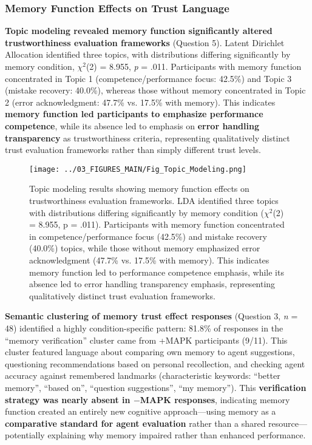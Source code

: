 \documentclass[12pt]{article}
\begin{document}
\subsubsection{Memory Function Effects on Trust Language}

\textbf{Topic modeling revealed memory function significantly altered trustworthiness evaluation frameworks} (Question 5). Latent Dirichlet Allocation identified three topics, with distributions differing significantly by memory condition, $\chi^2$(2) = 8.955, \textit{p} = .011. Participants with memory function concentrated in Topic 1 (competence/performance focus: 42.5\%) and Topic 3 (mistake recovery: 40.0\%), whereas those without memory concentrated in Topic 2 (error acknowledgment: 47.7\% vs. 17.5\% with memory). This indicates \textbf{memory function led participants to emphasize performance competence}, while its absence led to emphasis on \textbf{error handling transparency} as trustworthiness criteria, representing qualitatively distinct trust evaluation frameworks rather than simply different trust levels.

\begin{figure}[h]
\centering
\texttt{[image: ../03\_FIGURES\_MAIN/Fig\_Topic\_Modeling.png]}
\caption{Topic modeling results showing memory function effects on trustworthiness evaluation frameworks. LDA identified three topics with distributions differing significantly by memory condition ($\chi^2$(2) = 8.955, p = .011). Participants with memory function concentrated in competence/performance focus (42.5\%) and mistake recovery (40.0\%) topics, while those without memory emphasized error acknowledgment (47.7\% vs. 17.5\% with memory). This indicates memory function led to performance competence emphasis, while its absence led to error handling transparency emphasis, representing qualitatively distinct trust evaluation frameworks.}
\label{fig:topic_modeling}
\end{figure}

\textbf{Semantic clustering of memory trust effect responses} (Question 3, \textit{n} = 48) identified a highly condition-specific pattern: 81.8\% of responses in the ``memory verification'' cluster came from +MAPK participants (9/11). This cluster featured language about comparing own memory to agent suggestions, questioning recommendations based on personal recollection, and checking agent accuracy against remembered landmarks (characteristic keywords: ``better memory'', ``based on'', ``question suggestions'', ``my memory''). This \textbf{verification strategy was nearly absent in $-$MAPK responses}, indicating memory function created an entirely new cognitive approach—using memory as a \textbf{comparative standard for agent evaluation} rather than a shared resource—potentially explaining why memory impaired rather than enhanced performance.
\end{document}
